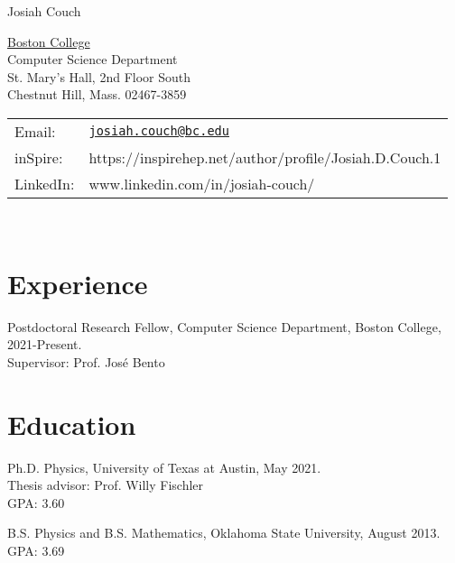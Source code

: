 \documentclass[letterpaper]{article}
\def\name{Josiah Couch}
\renewenvironment{itemize}{
  \begin{list}{}{
    \setlength{\leftmargin}{1.5em}
  }
}{
  \end{list}
}
\begin{document}
{\huge \name}


\vspace{0.25in}

\begin{minipage}{0.45\linewidth}
  \href{https://www.bc.edu/bc-web/schools/mcas/departments/computer-science.html}{Boston College} \\
  Computer Science Department\\
  St. Mary's Hall, 2nd Floor South \\
  Chestnut Hill, Mass. 02467-3859
\end{minipage}
\begin{minipage}{0.45\linewidth}
  \begin{tabular}{ll}
    Email: & \href{mailto:josiah.couch@utexas.edu}{\tt josiah.couch@bc.edu} \\
    inSpire: & https://inspirehep.net/author/profile/Josiah.D.Couch.1\\
    LinkedIn: & www.linkedin.com/in/josiah-couch/ 
  \end{tabular}
\end{minipage}
\

\section*{Experience}

\begin{itemize}

\item Postdoctoral Research Fellow, Computer Science Department, Boston College, \hfill  2021-Present.\\
  Supervisor: Prof. Jos\'e Bento \\

\end{itemize}

\section*{Education}

\begin{itemize}

\item Ph.D. Physics, University of Texas at Austin, \hfill  May 2021.\\
  Thesis advisor: Prof. Willy Fischler\\
  GPA: 3.60
  
  
  \item B.S. Physics and B.S. Mathematics, Oklahoma State University, \hfill August 2013.\\
  GPA: 3.69

\end{itemize}
\end{document}
